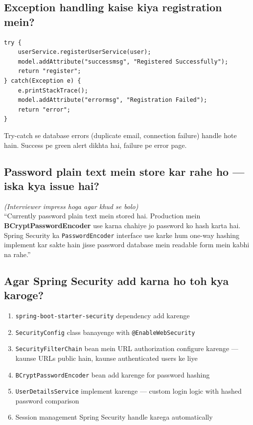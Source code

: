 \documentclass[12pt,a4paper]{article}
\begin{document}
\subsection{Exception handling kaise kiya registration mein?}

\begin{answerbox}
\begin{lstlisting}[language=JavaCustom]
try {
    userService.registerUserService(user);
    model.addAttribute("successmsg", "Registered Successfully");
    return "register";
} catch(Exception e) {
    e.printStackTrace();
    model.addAttribute("errormsg", "Registration Failed");
    return "error";
}
\end{lstlisting}
Try-catch se database errors (duplicate email, connection failure) handle hote hain. Success pe green alert dikhta hai, failure pe error page.
\end{answerbox}

\subsection{Password plain text mein store kar rahe ho --- iska kya issue hai?}

\begin{tipbox}
\textit{(Interviewer impress hoga agar khud se bolo)}\\[5pt]
``Currently password plain text mein stored hai. Production mein \textbf{BCryptPasswordEncoder} use karna chahiye jo password ko hash karta hai. Spring Security ka \texttt{PasswordEncoder} interface use karke hum one-way hashing implement kar sakte hain jisse password database mein readable form mein kabhi na rahe.''
\end{tipbox}

\subsection{Agar Spring Security add karna ho toh kya karoge?}

\begin{answerbox}
\begin{enumerate}
    \item \texttt{spring-boot-starter-security} dependency add karenge
    \item \texttt{SecurityConfig} class banayenge with \texttt{@EnableWebSecurity}
    \item \texttt{SecurityFilterChain} bean mein URL authorization configure karenge --- kaunse URLs public hain, kaunse authenticated users ke liye
    \item \texttt{BCryptPasswordEncoder} bean add karenge for password hashing
    \item \texttt{UserDetailsService} implement karenge --- custom login logic with hashed password comparison
    \item Session management Spring Security handle karega automatically
\end{enumerate}
\end{answerbox}
\end{document}
